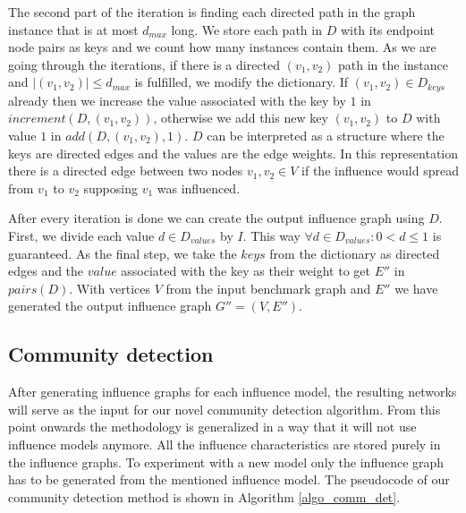 \documentclass[pdflatex,sn-mathphys-ay]{sn-jnl}
\begin{document}
The second part of the iteration is finding each directed path in the graph instance that is at most $d_{max}$ long. We store each path in $D$ with its endpoint node pairs as keys and we count how many instances contain them. As we are going through the iterations, if there is a directed $(v_1,v_2)$ path in the instance and $|(v_1,v_2)| \leq d_{max}$ is fulfilled, we modify the dictionary. If $(v_1,v_2) \in D_{keys}$ already then we increase the value associated with the key by $1$ in $increment(D,(v_1,v_2))$, otherwise we add this new key $(v_1,v_2)$ to $D$ with value $1$ in $add(D,(v_1,v_2),1)$. $D$ can be interpreted as a structure where the keys are directed edges and the values are the edge weights. In this representation there is a directed edge between two nodes $v_1,v_2 \in V$ if the influence would spread from $v_1$ to $v_2$ supposing $v_1$ was influenced.

After every iteration is done we can create the output influence graph using $D$. First, we divide each value $d \in D_{values}$ by $I$. This way $\forall d \in D_{values}: 0 < d \leq 1$ is guaranteed. As the final step, we take the $keys$ from the dictionary as directed edges and the $value$ associated with the key as their weight to get $E''$ in $pairs(D)$. With vertices $V$ from the input benchmark graph and $E''$ we have generated the output influence graph $G''=(V,E'')$.


\subsection{Community detection}\label{subsec_commdet}

After generating influence graphs for each influence model, the resulting networks will serve as the input for our novel community detection algorithm. From this point onwards the methodology is generalized in a way that it will not use influence models anymore. All the influence characteristics are stored purely in the influence graphs. To experiment with a new model only the influence graph has to be generated from the mentioned influence model. The pseudocode of our community detection method is shown in Algorithm \ref{algo_comm_det}.
\end{document}

